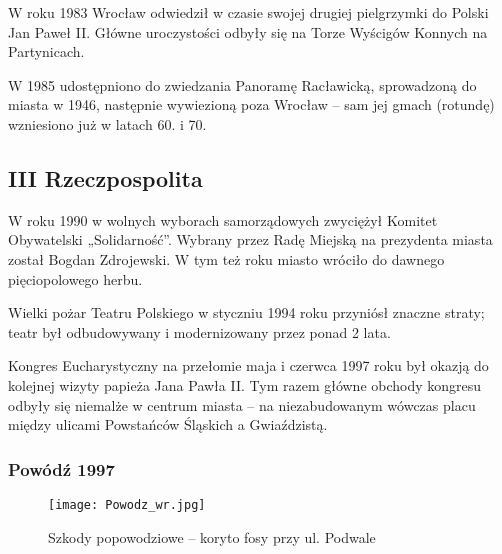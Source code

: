 \documentclass{article}
\begin{document}
W roku 1983 Wrocław odwiedził w czasie swojej drugiej pielgrzymki do Polski Jan Paweł II. Główne uroczystości odbyły się na Torze Wyścigów Konnych na Partynicach.

W 1985 udostępniono do zwiedzania Panoramę Racławicką, sprowadzoną do miasta w 1946, następnie wywiezioną poza Wrocław – sam jej gmach (rotundę) wzniesiono już w latach 60. i 70.

\subsection{III Rzeczpospolita}
W roku 1990 w wolnych wyborach samorządowych zwyciężył Komitet Obywatelski „Solidarność”. Wybrany przez Radę Miejską na prezydenta miasta został Bogdan Zdrojewski. W tym też roku miasto wróciło do dawnego pięciopolowego herbu.

Wielki pożar Teatru Polskiego w styczniu 1994 roku przyniósł znaczne straty; teatr był odbudowywany i modernizowany przez ponad 2 lata.

Kongres Eucharystyczny na przełomie maja i czerwca 1997 roku był okazją do kolejnej wizyty papieża Jana Pawła II. Tym razem główne obchody kongresu odbyły się niemalże w centrum miasta – na niezabudowanym wówczas placu między ulicami Powstańców Śląskich a Gwiaździstą.

\subsubsection{Powódź 1997}

\begin{wrapfigure}{r}{0.37\textwidth} 
\begin{center}
\vspace{-20pt}
\texttt{[image: Powodz\_wr.jpg]}
\end{center}
\vspace{-20pt}
\caption{Szkody popowodziowe – koryto fosy przy ul. Podwale}
\vspace{-10pt}
\end{wrapfigure}
\end{document}
